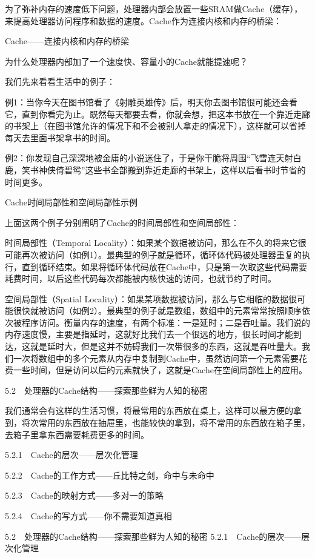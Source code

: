\documentclass[12pt,UTF8]{ctexbook}
\begin{document}
为了弥补内存的速度低下问题，处理器内部会放置一些SRAM做Cache（缓存），来提高处理器访问程序和数据的速度。Cache作为连接内核和内存的桥梁：

Cache——连接内核和内存的桥梁

为什么处理器内部加了一个速度快、容量小的Cache就能提速呢？

我们先来看看生活中的例子：

例1：当你今天在图书馆看了《射雕英雄传》后，明天你去图书馆很可能还会看它，直到你看完为止。既然每天都要去看，你就会想，把这本书放在一个靠近走廊的书架上（在图书馆允许的情况下和不会被别人拿走的情况下），这样就可以省掉每天去里面书架拿书的时间。

例2：你发现自己深深地被金庸的小说迷住了，于是你干脆将周围“飞雪连天射白鹿，笑书神侠倚碧鸳”这些书全部搬到靠近走廊的书架上，这样以后看书时节省的时间更多。

Cache时间局部性和空间局部性示例

上面这两个例子分别阐明了Cache的时间局部性和空间局部性：

时间局部性（Temporal Locality）：如果某个数据被访问，那么在不久的将来它很可能再次被访问（如例1）。最典型的例子就是循环，循环体代码被处理器重复的执行，直到循环结束。如果将循环体代码放在Cache中，只是第一次取这些代码需要耗费时间，以后这些代码每次都能被内核快速的访问，也就节约了时间。

空间局部性（Spatial Locality）：如果某项数据被访问，那么与它相临的数据很可能很快就被访问（如例2）。最典型的例子就是数组，数组中的元素常常按照顺序依次被程序访问。衡量内存的速度，有两个标准：一是延时；二是吞吐量。我们说的内存速度慢，主要是指延时，这就好比我们去一个很远的地方，很长时间才能到达，这就是延时大，但是这并不妨碍我们一次带很多的东西，这就是吞吐量大。我们一次将数组中的多个元素从内存中复制到Cache中，虽然访问第一个元素需要花费一些时间，但是访问以后的元素就快了，这就是Cache在空间局部性上的应用。



5.2　处理器的Cache结构——探索那些鲜为人知的秘密

我们通常会有这样的生活习惯，将最常用的东西放在桌上，这样可以最方便的拿到，将次常用的东西放在抽屉里，也能较快的拿到，将不常用的东西放在箱子里，去箱子里拿东西需要耗费更多的时间。

5.2.1　Cache的层次——层次化管理

5.2.2　Cache的工作方式——丘比特之剑，命中与未命中

5.2.3　Cache的映射方式——多对一的策略

5.2.4　Cache的写方式——你不需要知道真相


5.2　处理器的Cache结构——探索那些鲜为人知的秘密
5.2.1　Cache的层次——层次化管理
\end{document}
